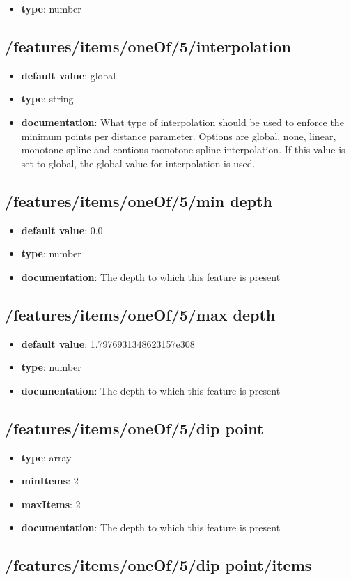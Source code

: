 \begin{itemize}\item {\bf type}: number
\end{itemize}\subsection{/features/items/oneOf/5/interpolation}
\begin{itemize}\item {\bf default value}: global
\item {\bf type}: string
\item {\bf documentation}: What type of interpolation should be used to enforce the minimum points per distance parameter. Options are global, none, linear, monotone spline and contious monotone spline interpolation. If this value is set to global, the global value for interpolation is used.
\end{itemize}\subsection{/features/items/oneOf/5/min depth}
\begin{itemize}\item {\bf default value}: 0.0
\item {\bf type}: number
\item {\bf documentation}: The depth to which this feature is present
\end{itemize}\subsection{/features/items/oneOf/5/max depth}
\begin{itemize}\item {\bf default value}: 1.7976931348623157e308
\item {\bf type}: number
\item {\bf documentation}: The depth to which this feature is present
\end{itemize}\subsection{/features/items/oneOf/5/dip point}
\begin{itemize}\item {\bf type}: array
\item {\bf minItems}: 2
\item {\bf maxItems}: 2
\item {\bf documentation}: The depth to which this feature is present
\end{itemize}\subsection{/features/items/oneOf/5/dip point/items}
